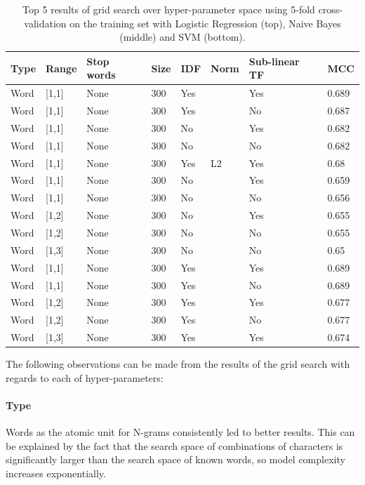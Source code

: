 \begin{table}[h]
  \begin{center}
  \begin{tabular}{ l l l l l l l l }
    \toprule
    Type & Range & Stop words & Size & IDF & Norm & Sub-linear TF & \gls{MCC} \\
    \midrule
    Word & [1,1] & None & 300 & Yes &  & Yes & 0.689 \\
    Word & [1,1] & None & 300 & Yes &  & No & 0.687 \\
    Word & [1,1] & None & 300 & No &  & Yes & 0.682 \\
    Word & [1,1] & None & 300 & No &  & No & 0.682 \\
    Word & [1,1] & None & 300 & Yes & L2 & Yes & 0.68 \\
    \midrule
    Word & [1,1] & None & 300 & No & & Yes & 0.659  \\
    Word & [1,1] & None & 300 & No & & No & 0.656 \\
    Word & [1,2] & None & 300 & No & & Yes & 0.655 \\
    Word & [1,2] & None & 300 & No & & No & 0.655 \\
    Word & [1,3] & None & 300 & No & & No & 0.65 \\
    \midrule
    Word & [1,1] & None & 300 & Yes & & Yes & 0.689 \\
    Word & [1,1] & None & 300 & Yes & & No  & 0.689 \\
    Word & [1,2] & None & 300 & Yes & & Yes & 0.677 \\
    Word & [1,2] & None & 300 & Yes & & No  & 0.677 \\
    Word & [1,3] & None & 300 & Yes & & Yes & 0.674 \\
    \bottomrule
  \end{tabular}
  \caption{Top 5 results of grid search over hyper-parameter space using 5-fold cross-validation on the training set with Logistic Regression (top), Naive Bayes (middle) and SVM (bottom).}
\label{tab:Ngram Grid Search}
\end{center}
\end{table}

The following observations can be made from the results of the grid search with regards to each of hyper-parameters:

\paragraph{Type}
\label{par:Type}
Words as the atomic unit for N-grams consistently led to better results. This can be explained by the fact that the search space of combinations of characters is significantly larger than the search space of known words, so model complexity increases exponentially.

